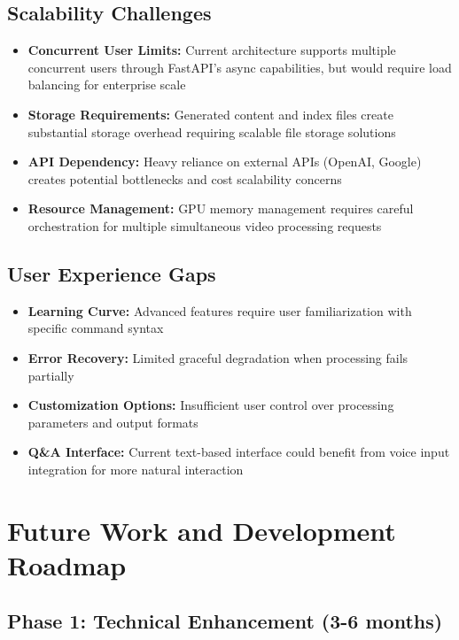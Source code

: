 \documentclass{bscs}
\begin{document}
\subsection{Scalability Challenges}

\begin{itemize}
\item \textbf{Concurrent User Limits:} Current architecture supports multiple concurrent users through FastAPI's async capabilities, but would require load balancing for enterprise scale
\item \textbf{Storage Requirements:} Generated content and index files create substantial storage overhead requiring scalable file storage solutions
\item \textbf{API Dependency:} Heavy reliance on external APIs (OpenAI, Google) creates potential bottlenecks and cost scalability concerns
\item \textbf{Resource Management:} GPU memory management requires careful orchestration for multiple simultaneous video processing requests
\end{itemize}

\subsection{User Experience Gaps}

\begin{itemize}
\item \textbf{Learning Curve:} Advanced features require user familiarization with specific command syntax
\item \textbf{Error Recovery:} Limited graceful degradation when processing fails partially
\item \textbf{Customization Options:} Insufficient user control over processing parameters and output formats
\item \textbf{Q\&A Interface:} Current text-based interface could benefit from voice input integration for more natural interaction
\end{itemize}

\section{Future Work and Development Roadmap}

\subsection{Phase 1: Technical Enhancement (3-6 months)}
\end{document}
